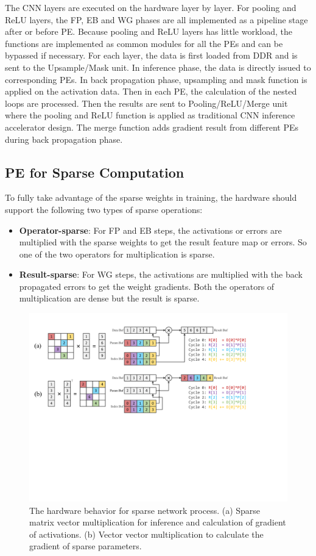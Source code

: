 The CNN layers are executed on the hardware layer by layer. For pooling and ReLU layers, the FP, EB and WG phases are all implemented as a pipeline stage after or before PE. Because pooling and ReLU layers has little workload, the functions are implemented as common modules for all the PEs and can be bypassed if necessary. For each layer, the data is first loaded from DDR and is sent to the Upsample/Mask unit. In inference phase, the data is directly issued to corresponding PEs. In back propagation phase, upsampling and mask function is applied on the activation data. Then in each PE, the calculation of the nested loops are processed. Then the results are sent to Pooling/ReLU/Merge unit where the pooling and ReLU function is applied as traditional CNN inference accelerator design. The merge function adds gradient result from different PEs during back propagation phase.

\subsection{PE for Sparse Computation}\label{sec:hw_pe}

To fully take advantage of the sparse weights in training, the hardware should support the following two types of sparse operations:
\begin{itemize}
\item {\bf Operator-sparse}: For FP and EB steps, the activations or errors are multiplied with the sparse weights to get the result feature map or errors. So one of the two operators for multiplication is sparse.
\item {\bf Result-sparse}: For WG steps, the activations are multiplied with the back propagated errors to get the weight gradients. Both the operators of multiplication are dense but the result is sparse.
\end{itemize}

\begin{figure}[htbp] 
  \centering
  \includegraphics[width=1.8\columnwidth]{figures/sparse_mv.pdf}
  \caption{The hardware behavior for sparse network process. (a) Sparse matrix vector multiplication for inference and calculation of gradient of activations. (b) Vector vector multiplication to calculate the gradient of sparse parameters. }
  \label{fig:spmv}
\end{figure}

